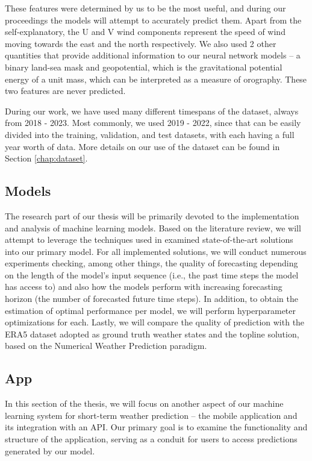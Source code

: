 These features were determined by us to be the most useful, and during our proceedings the models will attempt to accurately predict them. Apart from the self-explanatory, the U and V wind components represent the speed of wind moving towards the east and the north respectively. We also used 2 other quantities that provide additional information to our neural network models -- a binary land-sea mask and geopotential, which is the gravitational potential energy of a unit mass, which can be interpreted as a measure of orography. These two features are never predicted.

During our work, we have used many different timespans of the dataset, always from 2018 - 2023. Most commonly, we used 2019 - 2022, since that can be easily divided into the training, validation, and test datasets, with each having a full year worth of data. More details on our use of the dataset can be found in Section \ref{chap:dataset}.

\subsection{Models}
The research part of our thesis will be primarily devoted to the implementation and analysis of machine learning models. Based on the literature review, we will attempt to leverage the techniques used in examined state-of-the-art solutions into our primary model. For all implemented solutions, we will conduct numerous experiments checking, among other things, the quality of forecasting depending on the length of the model's input sequence (i.e., the past time steps the model has access to) and also how the models perform with increasing forecasting horizon (the number of forecasted future time steps). In addition, to obtain the estimation of optimal performance per model, we will perform hyperparameter optimizations for each. Lastly, we will compare the quality of prediction with the ERA5 dataset adopted as ground truth weather states and the topline solution, based on the Numerical Weather Prediction paradigm. 

\subsection{App}
In this section of the thesis, we will focus on another aspect of our machine learning system for short-term weather prediction – the mobile application and its integration with an API. Our primary goal is to examine the functionality and structure of the application, serving as a conduit for users to access predictions generated by our model.

